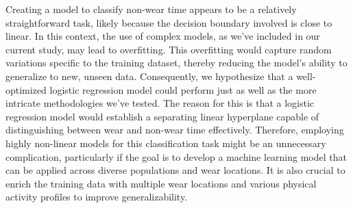 \documentclass[
  10pt,
]{scrbook}
\begin{document}
Creating a model to classify non-wear time appears to be a relatively
straightforward task, likely because the decision boundary involved is
close to linear. In this context, the use of complex models, as we've
included in our current study, may lead to overfitting. This overfitting
would capture random variations specific to the training dataset,
thereby reducing the model's ability to generalize to new, unseen data.
Consequently, we hypothesize that a well-optimized logistic regression
model could perform just as well as the more intricate methodologies
we've tested. The reason for this is that a logistic regression model
would establish a separating linear hyperplane capable of distinguishing
between wear and non-wear time effectively. Therefore, employing highly
non-linear models for this classification task might be an unnecessary
complication, particularly if the goal is to develop a machine learning
model that can be applied across diverse populations and wear locations.
It is also crucial to enrich the training data with multiple wear
locations and various physical activity profiles to improve
generalizability.
\end{document}
